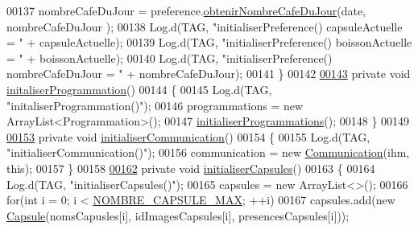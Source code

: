\begin{DoxyCode}
00137         nombreCafeDuJour = preference.\hyperlink{classcom_1_1example_1_1ekawa_1_1_preference_a5a8f4c9f845924a0ebb3aec5ca99a5f5}{obtenirNombreCafeDuJour}(date, nombreCafeDuJour
      );
00138         Log.d(TAG, \textcolor{stringliteral}{"initialiserPreference() capsuleActuelle = "} + capsuleActuelle);
00139         Log.d(TAG, \textcolor{stringliteral}{"initialiserPreference() boissonActuelle = "} + boissonActuelle);
00140         Log.d(TAG, \textcolor{stringliteral}{"initialiserPreference() nombreCafeDuJour = "} + nombreCafeDuJour);
00141     \}
00142 
\hyperlink{classcom_1_1example_1_1ekawa_1_1_cafetiere_aae065b86cdb3a8df2c904068aab7e9bf}{00143}     \textcolor{keyword}{private} \textcolor{keywordtype}{void} \hyperlink{classcom_1_1example_1_1ekawa_1_1_cafetiere_aae065b86cdb3a8df2c904068aab7e9bf}{initaliserProgrammation}()
00144     \{
00145         Log.d(TAG, \textcolor{stringliteral}{"initaliserProgrammation()"});
00146         programmations = \textcolor{keyword}{new} ArrayList<Programmation>();
00147         \hyperlink{classcom_1_1example_1_1ekawa_1_1_cafetiere_a406e5771edb1663ebb1fc571365b75ac}{initialiserProgrammations}();
00148     \}
00149 
\hyperlink{classcom_1_1example_1_1ekawa_1_1_cafetiere_ad7c3e155b2ddf4dae05da8cd9c38518a}{00153}     \textcolor{keyword}{private} \textcolor{keywordtype}{void} \hyperlink{classcom_1_1example_1_1ekawa_1_1_cafetiere_ad7c3e155b2ddf4dae05da8cd9c38518a}{initialiserCommunication}()
00154     \{
00155         Log.d(TAG, \textcolor{stringliteral}{"initialiserCommunication()"});
00156         communication = \textcolor{keyword}{new} \hyperlink{classcom_1_1example_1_1ekawa_1_1_communication}{Communication}(ihm, \textcolor{keyword}{this});
00157     \}
00158 
\hyperlink{classcom_1_1example_1_1ekawa_1_1_cafetiere_a75d0df422427eed8b12e7b46a6e11a35}{00162}     \textcolor{keyword}{private} \textcolor{keywordtype}{void} \hyperlink{classcom_1_1example_1_1ekawa_1_1_cafetiere_a75d0df422427eed8b12e7b46a6e11a35}{initialiserCapsules}()
00163     \{
00164         Log.d(TAG, \textcolor{stringliteral}{"initialiserCapsules()"});
00165         capsules = \textcolor{keyword}{new} ArrayList<>();
00166         \textcolor{keywordflow}{for}(\textcolor{keywordtype}{int} i = 0; i < \hyperlink{classcom_1_1example_1_1ekawa_1_1_cafetiere_a183d96e89c056c4ac9c565bf8f24851e}{NOMBRE\_CAPSULE\_MAX}; ++i)
00167             capsules.add(\textcolor{keyword}{new} \hyperlink{classcom_1_1example_1_1ekawa_1_1_capsule}{Capsule}(nomsCapusles[i], idImagesCapsules[i], presencesCapsules[i]));

\end{DoxyCode}
